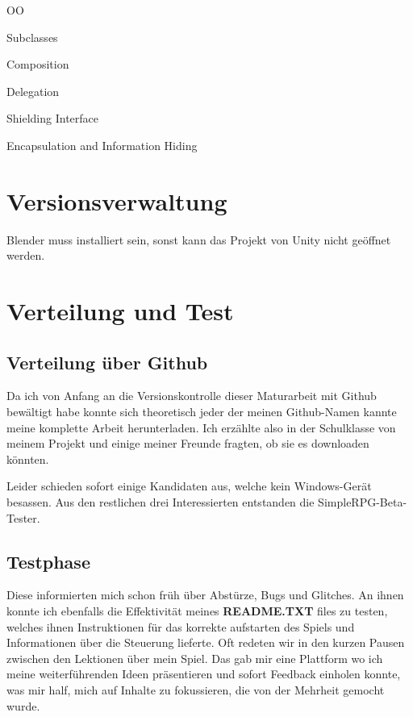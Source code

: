 
OO

Subclasses

Composition

Delegation

Shielding Interface

Encapsulation and Information Hiding


\section{Versionsverwaltung}


Blender muss installiert sein, sonst kann das Projekt von Unity nicht geöffnet werden.

\section{Verteilung und Test}

\subsection{Verteilung über Github}

Da ich von Anfang an die Versionskontrolle dieser Maturarbeit mit Github bewältigt habe konnte sich theoretisch jeder der meinen Github-Namen kannte meine komplette Arbeit herunterladen.\cite{csomormaturaarbeit19github}
Ich erzählte also in der Schulklasse von meinem Projekt und einige meiner Freunde fragten, ob sie es downloaden könnten.

Leider schieden sofort einige Kandidaten aus, welche kein Windows-Gerät besassen.
Aus den restlichen drei Interessierten entstanden die SimpleRPG-Beta-Tester.

\subsection{Testphase}

Diese informierten mich schon früh über Abstürze, Bugs und Glitches.
An ihnen konnte ich ebenfalls die Effektivität meines \textbf{README.TXT} files zu testen, welches ihnen Instruktionen für das korrekte aufstarten des Spiels und Informationen über die Steuerung lieferte.
Oft redeten wir in den kurzen Pausen zwischen den Lektionen über mein Spiel.
Das gab mir eine Plattform wo ich meine weiterführenden Ideen präsentieren und sofort Feedback einholen konnte, was mir half, mich auf Inhalte zu fokussieren, die von der Mehrheit gemocht wurde.


